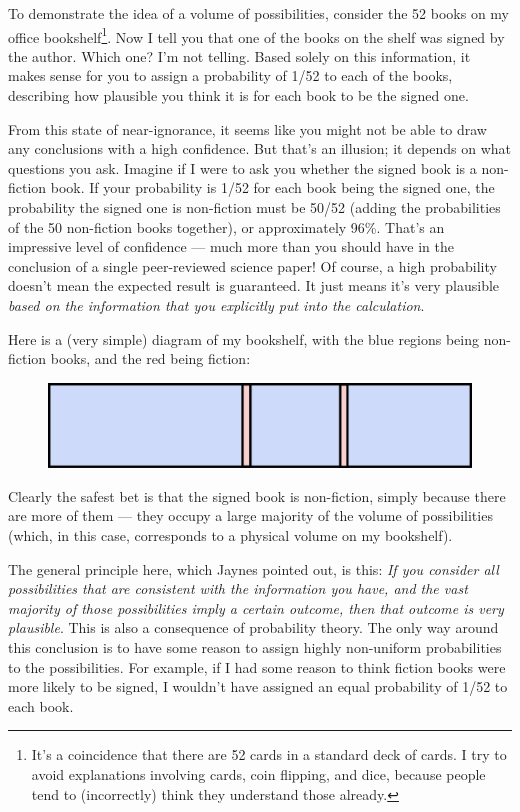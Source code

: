 \documentclass[a4paper, 12pt]{article}
\begin{document}
To demonstrate the idea of a volume of possibilities,
consider the 52 books on my office bookshelf\footnote{It's
a coincidence that there are 52 cards in a standard
deck of cards. I try to avoid explanations involving cards, coin flipping, and
dice, because people tend to (incorrectly) think they understand those already.}.
Now I tell you that one of the books on the shelf was
signed by the author. Which one? I'm not telling. Based solely on this
information, it makes sense for you to assign a probability of 1/52 to each of the
books, describing how plausible you think it is for each book to be the signed
one.

From this state of near-ignorance, it seems like you might not be able to draw
any conclusions with a high confidence. But that's an illusion; it depends on
what questions you ask. Imagine if I were to ask you whether the signed book
is a non-fiction book. If your probability is 1/52 for each book being the
signed one, the probability the signed one is non-fiction must be
50/52 (adding the probabilities of the 50 non-fiction books together), 
or approximately 96\%. That's an impressive level of confidence --- much more than you should have in the conclusion of a single peer-reviewed science paper!
Of course, a high probability doesn't mean the expected result is guaranteed. It just means it's very plausible {\em based on the
information that you explicitly put into the calculation}.

Here is a (very simple) diagram of my bookshelf, with the blue regions
being non-fiction books, and the red being fiction:
\begin{figure}[ht!]
\centering
\includegraphics{bookshelf.png}
\end{figure}
Clearly the safest bet is that the signed book is non-fiction, simply because
there are more of them --- they occupy a large majority of the volume of
possibilities (which, in this case, corresponds to a physical volume on my
bookshelf).

The general principle here, which Jaynes pointed out, is this:
{\em If you consider all possibilities that are consistent with
the information you have, and the vast majority of those possibilities
imply a certain outcome, then that outcome is very
plausible}. This is also a consequence of probability theory. The only
way around this conclusion is to have some reason to assign highly
non-uniform probabilities to the possibilities. For example, if I had
some reason to think fiction books were more likely to be signed, I wouldn't
have assigned an equal probability of 1/52 to each book.
\end{document}
